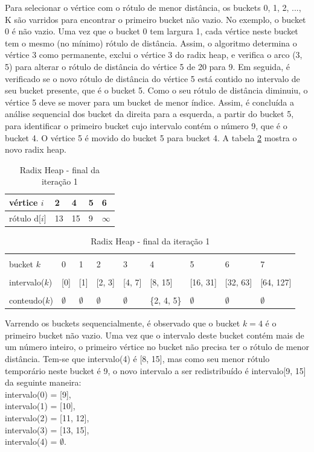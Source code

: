 Para selecionar o vértice com o rótulo de menor distância, os buckets 0, 1, 2, ..., K são varridos para encontrar o
primeiro bucket não vazio. No exemplo, o bucket 0 é não vazio. Uma vez que o bucket 0 tem largura 1,
cada vértice neste bucket tem o mesmo (no mínimo) rótulo de distância. Assim, o algoritmo determina o vértice 3 como permanente,
exclui o vértice 3 do radix heap, e verifica o arco (3, 5) para alterar o rótulo de distância do vértice 5 de 20 para 9.
Em seguida, é verificado se o novo rótulo de distância do vértice 5 está contido no intervalo de seu bucket presente,
que é o bucket 5. Como o seu rótulo de distância diminuiu, o vértice 5 deve se mover para um bucket de menor índice.
Assim, é concluída a análise sequencial dos bucket da direita para a esquerda, a partir do bucket 5,
para identificar o primeiro bucket cujo intervalo contém o número 9, que é o bucket 4.
O vértice 5 é movido do bucket 5 para bucket 4. A tabela \ref{tab:secondradixheap} mostra o novo radix heap.

\begin{table}[htbp]
	\centering
	\begin{tabular}{l l l l l}
	\toprule
	vértice $i$ & 2 & 4 & 5 & 6\\
	\midrule
	rótulo d[$i$] & 13 & 15 & 9 & $\infty$ \\
	\bottomrule
	\end{tabular}
	
	\centering
	\begin{tabular}{l l l l l l l l l}
	\toprule
	\\bucket $k$ & 0 & 1 & 2 & 3 & 4 & 5 & 6 & 7\\
	\midrule
	\\intervalo($k$) & [0] & [1] & [2, 3] & [4, 7] & [8, 15] & [16, 31] & [32, 63] & [64, 127]\\
	\\conteudo($k$) & $\emptyset$ & $\emptyset$ & $\emptyset$ & $\emptyset$ & \{2, 4, 5\} & $\emptyset$ & $\emptyset$ & $\emptyset$\\
	\bottomrule
	\end{tabular}
\caption{Radix Heap - final da iteração 1}
 \label{tab:secondradixheap}
\end{table}
\FloatBarrier
Varrendo os buckets sequencialmente, é observado que o bucket $k = 4$ é o primeiro bucket não vazio.
Uma vez que o intervalo deste bucket contém mais de um número inteiro, o primeiro vértice no bucket não precisa ter
o rótulo de menor distância. Tem-se que intervalo(4) é [8, 15], mas como seu menor rótulo temporário neste bucket é 9,
o novo intervalo a ser redistribuído é intervalo[9, 15] da seguinte maneira:\\
intervalo(0) = [9],\\
intervalo(1) = [10],\\
intervalo(2) = [11, 12],\\
intervalo(3) = [13, 15],\\
intervalo(4) = $\emptyset$.

